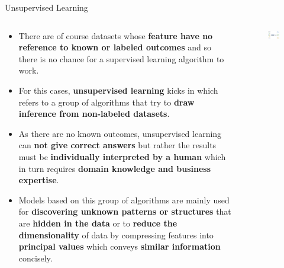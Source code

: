 \documentclass[main.tex]{subfiles}
\begin{document}
    \begin{frame}{Unsupervised Learning}
        \begin{columns}
            \begin{column}{.6\textwidth}
                \begin{itemize}
                    \item There are of course datasets whose \textbf{feature have no reference to known or labeled outcomes} and so there is no chance for a supervised learning algorithm to work.
                    \item For this cases, \textbf{unsupervised learning} kicks in which refers to a group of algorithms that try to \textbf{draw inference from non-labeled datasets}.
                    \item As there are no known outcomes, unsupervised learning can \textbf{not give correct answers} but rather the results must be \textbf{individually interpreted by a human} which in turn requires \textbf{domain knowledge and business expertise}.
                    \item Models based on this group of algorithms are mainly used for \textbf{discovering unknown patterns or structures} that are \textbf{hidden in the data} or to \textbf{reduce the dimensionality} of data by compressing features into \textbf{principal values} which conveys \textbf{similar information} concisely.
                \end{itemize}
            \end{column}
            \begin{column}{.4\textwidth}
                \begin{figure}
                    \label{fig:unsupervised-learning}
                    \includegraphics[width=\textwidth]{figures/drawio/unsupervised-learning.png}
                \end{figure}
            \end{column}
        \end{columns}
    \end{frame}
\end{document}
